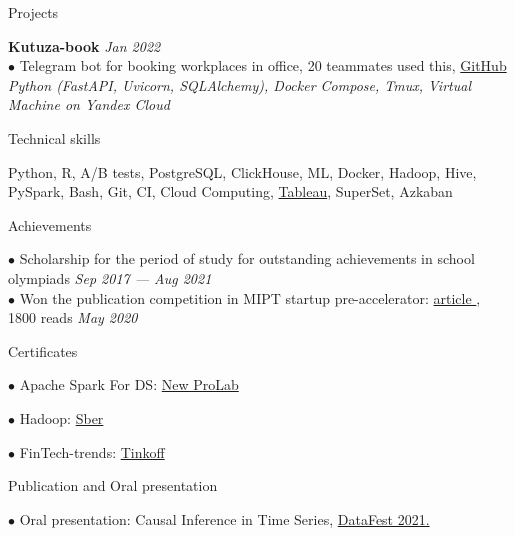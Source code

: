 \documentclass{resume} %
\begin{document}
\begin{rSection}{ Projects }

    { \bf Kutuza-book} \hfill {\em Jan 2022}\\
    { $\bullet$ Telegram bot for booking workplaces in office, 20 teammates used this, \href{https://github.com/YHx07/Kutuza-book}{GitHub}}\\
    { \it Python (FastAPI, Uvicorn, SQLAlchemy), Docker Compose, Tmux, Virtual Machine on Yandex Cloud }
    
\end{rSection}
    
\begin{rSection}{ Technical skills }
    
    Python, R, A/B tests, PostgreSQL, ClickHouse, ML, Docker, Hadoop, Hive, PySpark, Bash, Git, CI, Cloud Computing, \href{https://public.tableau.com/profile/dmitriy5983#!/}{Tableau}, SuperSet, Azkaban

\end{rSection}

\begin{rSection}{ Achievements }

    { $\bullet$ Scholarship for the period of study for outstanding achievements in school olympiads } \hfill {\em Sep 2017 — Aug 2021}\\
    { $\bullet$ Won the publication competition in MIPT startup pre-accelerator: \href{https://vc.ru/tribuna/125433-kak-my-hoteli-pomoch-taksistam-no-pandemiya-vse-isportila}{ article }, 1800 reads }\hfill {\em May 2020}

\end{rSection}

\begin{rSection}{ Certificates }
    
    \noindent
    \begin{multicols}{4}[]
    
    $\bullet$ Apache Spark For DS: \href{https://drive.google.com/file/d/1evNnhppurXyzoJdDQp115oRHAtRayW5c/view?usp=sharing}{New ProLab} 
    
    $\bullet$ Hadoop: \href{https://drive.google.com/file/d/1oKQetSzr_RCyxpTdWmbY30uNEQGlxMRn/view?usp=sharing}{Sber}
    
    $\bullet$ FinTech-trends: \href{https://drive.google.com/file/d/1kws8qPbbTlbQyyTZY5I2eY6o37Grdccv/view?usp=sharing}{Tinkoff}
    
    \end{multicols}

\end{rSection}

\begin{rSection}{ Publication and Oral presentation }

    { $\bullet$ Oral presentation: Causal Inference in Time Series, \href{https://youtu.be/Yr6b8Rpy7Ds}{DataFest 2021. }}\\
    
\end{rSection}
\end{document}

